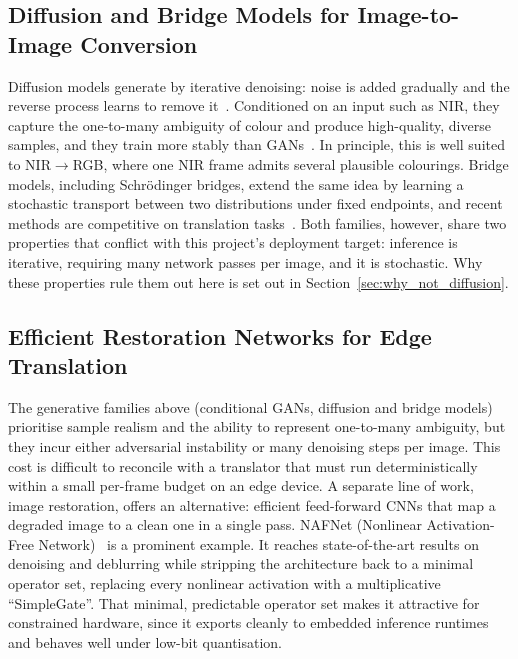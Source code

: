 \subsection{Diffusion and Bridge Models for Image-to-Image Conversion}
\label{sec:i2i_diffusion}

Diffusion models generate by iterative denoising: noise is added gradually and the reverse process learns to remove it~\cite{ho2020denoising}. Conditioned on an input such as NIR, they capture the one-to-many ambiguity of colour and produce high-quality, diverse samples, and they train more stably than GANs~\cite{saharia2022image}. In principle, this is well suited to NIR$\rightarrow$RGB, where one NIR frame admits several plausible colourings. Bridge models, including Schr\"odinger bridges, extend the same idea by learning a stochastic transport between two distributions under fixed endpoints, and recent methods are competitive on translation tasks~\cite{leonard2013survey,debortoli2021neural}. Both families, however, share two properties that conflict with this project's deployment target: inference is iterative, requiring many network passes per image, and it is stochastic. Why these properties rule them out here is set out in Section~\ref{sec:why_not_diffusion}.

\subsection{Efficient Restoration Networks for Edge Translation}
\label{sec:i2i_nafnet}

The generative families above (conditional GANs, diffusion and bridge models) prioritise sample realism and the ability to represent one-to-many ambiguity, but they incur either adversarial instability or many denoising steps per image. This cost is difficult to reconcile with a translator that must run deterministically within a small per-frame budget on an edge device. A separate line of work, image restoration, offers an alternative: efficient feed-forward CNNs that map a degraded image to a clean one in a single pass. NAFNet (Nonlinear Activation-Free Network)~\cite{chen2022nafnet} is a prominent example. It reaches state-of-the-art results on denoising and deblurring while stripping the architecture back to a minimal operator set, replacing every nonlinear activation with a multiplicative ``SimpleGate''. That minimal, predictable operator set makes it attractive for constrained hardware, since it exports cleanly to embedded inference runtimes and behaves well under low-bit quantisation.

